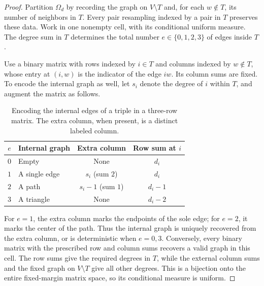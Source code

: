 \begin{proof}
Partition $\Omega_d$ by recording the graph on $V\setminus T$ and,
for each $w\notin T$, its number of neighbors in $T$.
Every pair resampling indexed by a pair in $T$ preserves these data.
Work in one nonempty cell, with its conditional uniform measure.
The degree sum in $T$ determines the total number $e\in\{0,1,2,3\}$
of edges inside $T$.

Use a binary matrix with rows indexed by $i\in T$ and columns indexed
by $w\notin T$, whose entry at $(i,w)$ is the indicator of the edge
$iw$.  Its column sums are fixed.  To encode the internal graph as
well, let $s_i$ denote the degree of $i$ within $T$, and augment the
matrix as follows.
\begin{table}[ht]
\centering
\begin{tabular}{c|l|c|c}
$e$ & Internal graph & Extra column & Row sum at $i$\\ \hline
$0$ & Empty & None & $d_i$\\
$1$ & A single edge & $s_i$ (sum $2$) & $d_i$\\
$2$ & A path & $s_i-1$ (sum $1$) & $d_i-1$\\
$3$ & A triangle & None & $d_i-2$
\end{tabular}
\caption{Encoding the internal edges of a triple in a three-row matrix.
The extra column, when present, is a distinct labeled column.}
\label{tri:encoding}
\end{table}

For $e=1$, the extra column marks the endpoints of the sole edge;
for $e=2$, it marks the center of the path.  Thus the internal graph is
uniquely recovered from the extra column, or is deterministic when
$e=0,3$.  Conversely, every binary matrix with the prescribed row and
column sums recovers a valid graph in this cell.  The row sums give
the required degrees in $T$, while the external column sums and the
fixed graph on $V\setminus T$ give all other degrees.  This is a
bijection onto the entire fixed-margin matrix space, so its
conditional measure is uniform.


\end{proof}
